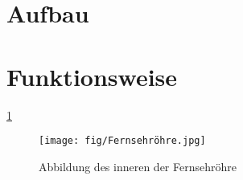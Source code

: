 \section{Aufbau}

\section{Funktionsweise}
\ref{fig:Fernsehröhre}
\cite{Fernsehroehre}
\begin{figure}
    \centering
    \texttt{[image: fig/Fernsehröhre.jpg]}
    \caption{Abbildung des inneren der Fernsehröhre}
    \label{fig:Fernsehröhre}
\end{figure}
